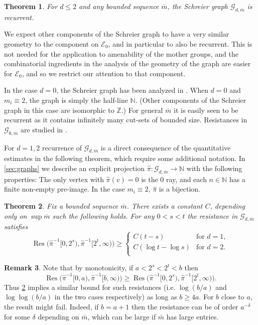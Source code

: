 \documentclass[12pt]{article}
\newtheorem{thm}{Theorem}[section]
\theoremstyle{definition}
\newtheorem{remark}[thm]{Remark}
\numberwithin{equation}{section}
\newcommand{\Z}{\mathbb Z}
\newcommand{\N}{\mathbb N}
\newcommand{\cG}{\mathcal{G}}
\newcommand{\cE}{\mathcal{E}}
\renewcommand{\hat}{\widehat}
\newcommand{\Res}{\operatorname{Res}}
\newcommand{\mbar}{{\overline m}}
\begin{document}
\begin{thm}\label{T:recurrent}
  For $d\leq 2$ and any bounded sequence $\mbar$, the Schreier graph
  $\cG_{d,\mbar}$ is recurrent.
\end{thm}

We expect other components of the Schreier graph to have a very similar geometry to the component on $\cE_0$, and in particular to also be recurrent.
This is not needed for the application to amenability of the mother groups, and the combinatorial ingredients in the analysis of the geometry of the graph are easier for $\cE_0$, and so we restrict our attention to that component.

In the case $d=0$, the Schreier graph has been analyzed in \cite{AV}.
When $d=0$ and $m_i \equiv 2$, the graph is simply the half-line $\N$.
(Other components of the Schreier graph in this case are isomorphic to $\Z$.)
For general $\mbar$ it is easily seen to be recurrent as it contains infinitely many cut-sets of bounded size.
Resistances in $\cG_{0,\mbar}$ are studied in \cite{AV}.

For $d=1,2$ recurrence of $\cG_{d,\mbar}$ is a direct consequence of the quantitative estimates in the following theorem, which require some additional notation.
In \cref{sec:graphs} we describe an explicit projection $\hat\pi:\cG_{d,\mbar} \to \N$ with the following properties: The only vertex with $\hat\pi(v)=0$ is the $0$ ray, and each $n\in\N$ has a finite non-empty pre-image.
In the case $m_i\equiv 2$, $\hat\pi$ is a bijection.

\begin{thm}
  \label{T:resistance}
  Fix a bounded sequence $\mbar$.
  There exists a constant $C$, depending only on $\sup\mbar$ such the following holds.
  For any $0<s<t$ the resistance in $\cG_{d,\mbar}$ satisfies
  \[
    \Res\big(\hat\pi^{-1}[0,2^s), \hat\pi^{-1}[2^t,\infty)\big) \geq
    \begin{cases}
      C(t-s) & \text{for } d=1, \\
      C(\log t-\log s) & \text{for } d=2. \\
    \end{cases}
  \]
\end{thm}

\begin{remark}
Note that by monotonicity, if $a<2^s<2^t<b$ then
\[  \Res\big(\hat\pi^{-1}[0,a), \hat\pi^{-1}[b,\infty)\big) \geq \Res\big(\hat\pi^{-1}[0,2^s), \hat\pi^{-1}[2^t,\infty)\big). \]
Thus \cref{T:resistance} implies a similar bound for such resistances
(i.e. $\log(b/a)$ and $\log\log(b/a)$ in the two cases respectively) as long as $b\ge 4a$.
For $b$ close to $a$, the result might fail.
Indeed, if $b=a+1$ then the resistance can be of order $a^{-\delta}$ for some $\delta$ depending on $\bar{m}$, which can be large if $\bar{m}$ has large entries.
\end{remark}
\end{document}
